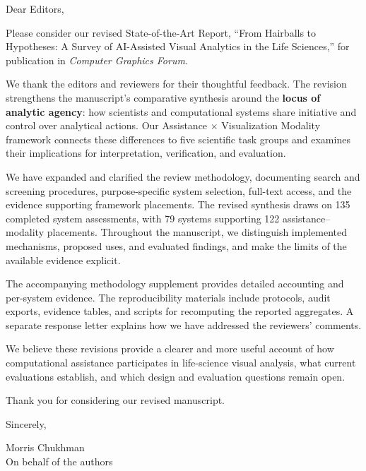 \documentclass[11pt]{article}
\begin{document}
Dear Editors,

Please consider our revised State-of-the-Art Report, ``From Hairballs to Hypotheses: A Survey of AI-Assisted Visual Analytics in the Life Sciences,'' for publication in \textit{Computer Graphics Forum}.

We thank the editors and reviewers for their thoughtful feedback. The revision strengthens the manuscript's comparative synthesis around the \textbf{locus of analytic agency}: how scientists and computational systems share initiative and control over analytical actions. Our Assistance $\times$ Visualization Modality framework connects these differences to five scientific task groups and examines their implications for interpretation, verification, and evaluation.

We have expanded and clarified the review methodology, documenting search and screening procedures, purpose-specific system selection, full-text access, and the evidence supporting framework placements. The revised synthesis draws on 135 completed system assessments, with 79 systems supporting 122 assistance--modality placements. Throughout the manuscript, we distinguish implemented mechanisms, proposed uses, and evaluated findings, and make the limits of the available evidence explicit.

The accompanying methodology supplement provides detailed accounting and per-system evidence. The reproducibility materials include protocols, audit exports, evidence tables, and scripts for recomputing the reported aggregates. A separate response letter explains how we have addressed the reviewers' comments.

We believe these revisions provide a clearer and more useful account of how computational assistance participates in life-science visual analysis, what current evaluations establish, and which design and evaluation questions remain open.

Thank you for considering our revised manuscript.

\bigskip
Sincerely,

\bigskip
Morris Chukhman\\
On behalf of the authors
\end{document}
